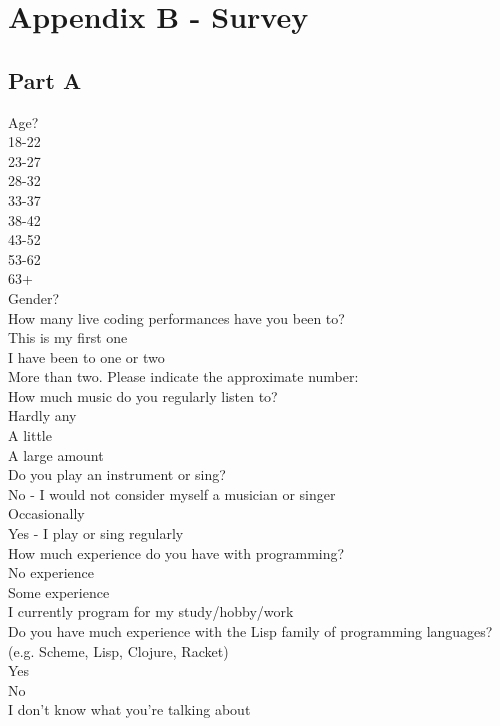 \documentclass[12pt]{article}
\begin{document}
\newpage
\section*{Appendix B - Survey}

\subsection*{Part A}

Age?\\
18-22\\
23-27\\
28-32\\
33-37\\
38-42\\
43-52\\
53-62\\
63+\\

Gender?   \underline{\hspace{3cm}}\\

How many live coding performances have you been to?\\
This is my first one\\
I have been to one or two\\
More than two. Please indicate the approximate number:   \underline{\hspace{3cm}}\\

How much music do you regularly listen to?\\
Hardly any\\
A little\\
A large amount\\

Do you play an instrument or sing?\\
No - I would not consider myself a musician or singer\\
Occasionally\\
Yes - I play or sing regularly\\

How much experience do you have with programming?\\
No experience\\
Some experience\\
I currently program for my study/hobby/work\\

Do you have much experience with the Lisp family of programming languages? (e.g. Scheme, Lisp, Clojure, Racket)\\
Yes\\
No\\
I don’t know what you’re talking about\\
\end{document}
